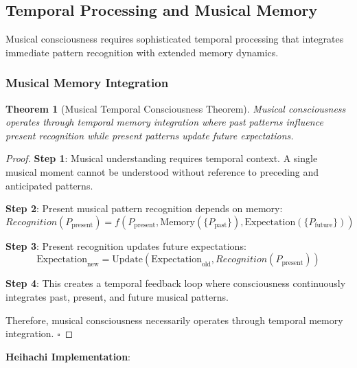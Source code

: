 \documentclass[12pt,a4paper]{article}
\newtheorem{theorem}{Theorem}[section]
\begin{document}
\subsection{Temporal Processing and Musical Memory}

Musical consciousness requires sophisticated temporal processing that integrates immediate pattern recognition with extended memory dynamics.

\subsubsection{Musical Memory Integration}

\begin{theorem}[Musical Temporal Consciousness Theorem]
Musical consciousness operates through temporal memory integration where past patterns influence present recognition while present patterns update future expectations.
\end{theorem}

\begin{proof}
\textbf{Step 1}: Musical understanding requires temporal context. A single musical moment cannot be understood without reference to preceding and anticipated patterns.

\textbf{Step 2}: Present musical pattern recognition depends on memory:
$$Recognition(P_{\text{present}}) = f(P_{\text{present}}, \text{Memory}(\{P_{\text{past}}\}), \text{Expectation}(\{P_{\text{future}}\}))$$

\textbf{Step 3}: Present recognition updates future expectations:
$$\text{Expectation}_{\text{new}} = \text{Update}(\text{Expectation}_{\text{old}}, Recognition(P_{\text{present}}))$$

\textbf{Step 4}: This creates a temporal feedback loop where consciousness continuously integrates past, present, and future musical patterns.

Therefore, musical consciousness necessarily operates through temporal memory integration. $\square$
\end{proof}

\textbf{Heihachi Implementation}:
\end{document}
